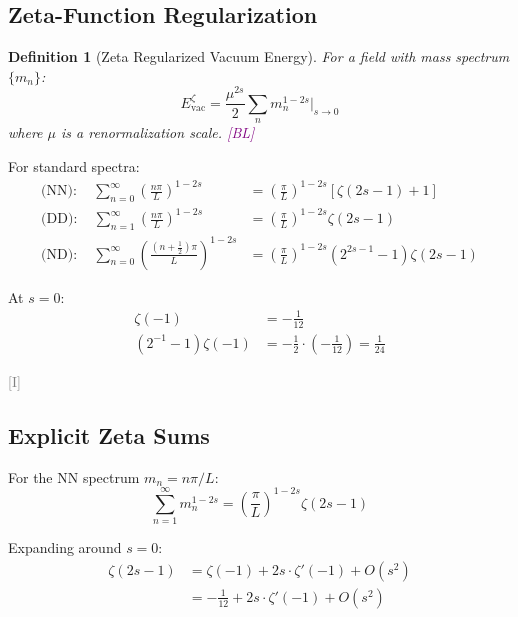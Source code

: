 \documentclass[11pt,a4paper]{article}
\newtheorem{definition}[theorem]{Definition}
\newcommand{\tagI}{\textcolor{gray}{[I]}}
\newcommand{\tagBL}{\textcolor{purple}{[BL]}}
\begin{document}
\subsection{Zeta-Function Regularization}

\begin{definition}[Zeta Regularized Vacuum Energy]
\label{def:zeta-reg}
For a field with mass spectrum $\{m_n\}$:
\begin{equation}
\label{eq:zeta-vac}
E_{\text{vac}}^{\zeta} = \frac{\mu^{2s}}{2} \sum_n m_n^{1-2s} \bigg|_{s \to 0}
\end{equation}
where $\mu$ is a renormalization scale. \tagBL
\end{definition}

For standard spectra:
\begin{align}
\label{eq:zeta-NN}
\text{(NN)}: \quad \sum_{n=0}^\infty \left(\frac{n\pi}{L}\right)^{1-2s} &=
\left(\frac{\pi}{L}\right)^{1-2s} \left[\zeta(2s-1) + 1\right] \\
\label{eq:zeta-DD}
\text{(DD)}: \quad \sum_{n=1}^\infty \left(\frac{n\pi}{L}\right)^{1-2s} &=
\left(\frac{\pi}{L}\right)^{1-2s} \zeta(2s-1) \\
\label{eq:zeta-ND}
\text{(ND)}: \quad \sum_{n=0}^\infty \left(\frac{(n+\tfrac{1}{2})\pi}{L}\right)^{1-2s} &=
\left(\frac{\pi}{L}\right)^{1-2s} (2^{2s-1} - 1)\zeta(2s-1)
\end{align}

At $s = 0$:
\begin{align}
\label{eq:zeta-val-1}
\zeta(-1) &= -\frac{1}{12} \\
\label{eq:zeta-val-eta}
(2^{-1} - 1)\zeta(-1) &= -\frac{1}{2} \cdot \left(-\frac{1}{12}\right) = \frac{1}{24}
\end{align}

\tagI

\subsection{Explicit Zeta Sums}

For the NN spectrum $m_n = n\pi/L$:
\begin{equation}
\label{eq:zeta-NN-explicit}
\sum_{n=1}^\infty m_n^{1-2s} = \left(\frac{\pi}{L}\right)^{1-2s} \zeta(2s-1)
\end{equation}

Expanding around $s = 0$:
\begin{align}
\label{eq:zeta-expand-1}
\zeta(2s-1) &= \zeta(-1) + 2s \cdot \zeta'(-1) + O(s^2) \\
\label{eq:zeta-expand-2}
&= -\frac{1}{12} + 2s \cdot \zeta'(-1) + O(s^2)
\end{align}
\end{document}
